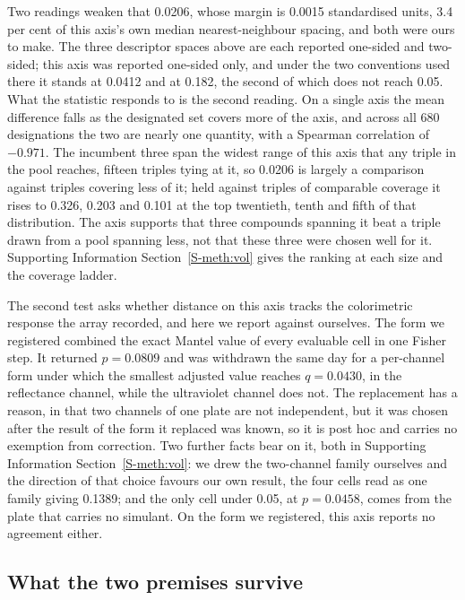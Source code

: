 \documentclass[journal=ancham,manuscript=article,margin=1in]{achemso}
\begin{document}
Two readings weaken that 0.0206, whose margin is 0.0015 standardised units,
3.4 per cent of this axis's own median nearest-neighbour spacing, and both were
ours to make. The three
descriptor spaces above are each reported one-sided and two-sided; this axis was
reported one-sided only, and under the two conventions used there it stands at
0.0412 and at 0.182, the second of which does not reach 0.05. What the statistic
responds to is the second reading. On a single axis the mean difference falls as
the designated set covers more of the axis, and across all 680 designations the
two are nearly one quantity, with a Spearman correlation of $-0.971$. The
incumbent three span the widest range of this axis that any triple in the pool
reaches, fifteen triples tying at it, so
0.0206 is largely a comparison against triples covering less of it; held against
triples of comparable coverage it rises to 0.326, 0.203 and 0.101 at the top
twentieth, tenth and fifth of that distribution. The axis supports that three compounds spanning it
beat a triple drawn from a pool spanning less, not that these three were chosen
well for it. Supporting Information Section~\ref{S-meth:vol} gives the ranking
at each size and the coverage ladder.

The second test asks whether distance on this axis tracks the colorimetric
response the array recorded, and here we report against ourselves. The form we
registered combined the exact Mantel value of every evaluable cell in one Fisher
step. It returned $p = 0.0809$ and was withdrawn the same day for a per-channel
form under which the smallest adjusted value reaches $q = 0.0430$, in the
reflectance channel, while the ultraviolet channel does not. The replacement has
a reason, in that two channels of one plate are not independent, but it was
chosen after the result of the form it replaced was known, so it is post hoc and
carries no exemption from correction. Two further facts bear on it, both in
Supporting Information Section~\ref{S-meth:vol}: we drew the two-channel family
ourselves and the direction of that choice favours our own result, the four
cells read as one family giving 0.1389; and the only cell under 0.05, at
$p = 0.0458$, comes from the plate that carries no simulant. On the form we
registered, this axis reports no agreement either.

\subsection{What the two premises survive}
\label{res:measured}
\label{res:toxsummary}
\end{document}
